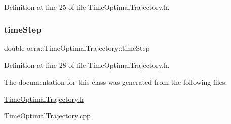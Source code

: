 Definition at line 25 of file Time\+Optimal\+Trajectory.\+h.

\hypertarget{classocra_1_1TimeOptimalTrajectory_aacee4e110122959c3f47c07a9b7796bf}{}\label{classocra_1_1TimeOptimalTrajectory_aacee4e110122959c3f47c07a9b7796bf} 
\subsubsection{\texorpdfstring{time\+Step}{timeStep}}
{\footnotesize\ttfamily double ocra\+::\+Time\+Optimal\+Trajectory\+::time\+Step\hspace{0.3cm}{\ttfamily [protected]}}



Definition at line 28 of file Time\+Optimal\+Trajectory.\+h.



The documentation for this class was generated from the following files\+:\begin{DoxyCompactItemize}
\item 
\hyperlink{TimeOptimalTrajectory_8h}{Time\+Optimal\+Trajectory.\+h}\item 
\hyperlink{TimeOptimalTrajectory_8cpp}{Time\+Optimal\+Trajectory.\+cpp}\end{DoxyCompactItemize}
